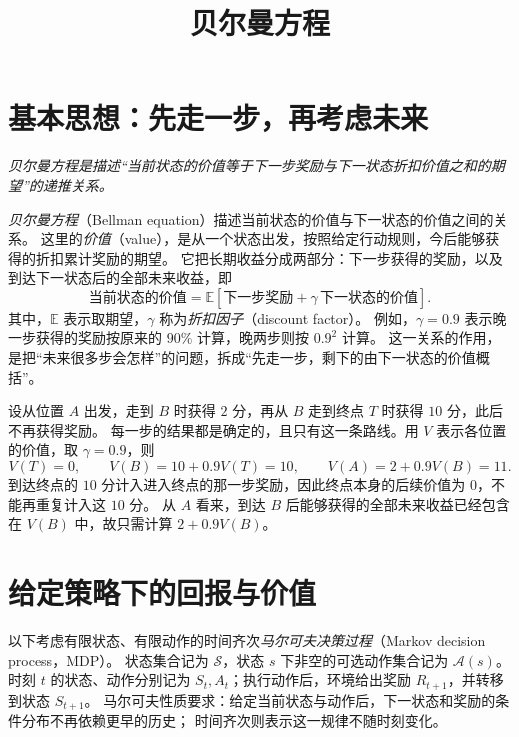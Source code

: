 \documentclass[UTF8,12pt,a4paper,fontset=fandol]{ctexart}
\title{贝尔曼方程}
\author{}
\date{}
\begin{document}
\maketitle

\section{基本思想：先走一步，再考虑未来}
\label{sec:bellman-intuition}

\emph{贝尔曼方程是描述“当前状态的价值等于下一步奖励与下一状态折扣价值之和的期望”的递推关系。}

\emph{贝尔曼方程}（Bellman equation）描述当前状态的价值与下一状态的价值之间的关系。
这里的\emph{价值}（value），是从一个状态出发，按照给定行动规则，今后能够获得的折扣累计奖励的期望。
它把长期收益分成两部分：下一步获得的奖励，以及到达下一状态后的全部未来收益，即
\[
  \boxed{\text{当前状态的价值}
  =\mathbb E\!\left[\text{下一步奖励}+\gamma\,\text{下一状态的价值}\right].}
\]
其中，$\mathbb E$ 表示取期望，$\gamma$ 称为\emph{折扣因子}（discount factor）。
例如，$\gamma=0.9$ 表示晚一步获得的奖励按原来的 $90\%$ 计算，晚两步则按 $0.9^2$ 计算。
这一关系的作用，是把“未来很多步会怎样”的问题，拆成“先走一步，剩下的由下一状态的价值概括”。

\begin{example}[两步到达终点]
\label{ex:bellman-two-step}
设从位置 $A$ 出发，走到 $B$ 时获得 $2$ 分，再从 $B$ 走到终点 $T$ 时获得 $10$ 分，此后不再获得奖励。
每一步的结果都是确定的，且只有这一条路线。用 $V$ 表示各位置的价值，取 $\gamma=0.9$，则
\[
  V(T)=0,\qquad
  V(B)=10+0.9V(T)=10,\qquad
  V(A)=2+0.9V(B)=11.
\]
到达终点的 $10$ 分计入进入终点的那一步奖励，因此终点本身的后续价值为 $0$，不能再重复计入这 $10$ 分。
从 $A$ 看来，到达 $B$ 后能够获得的全部未来收益已经包含在 $V(B)$ 中，故只需计算 $2+0.9V(B)$。
\end{example}

\section{给定策略下的回报与价值}
\label{sec:bellman-value}

以下考虑有限状态、有限动作的时间齐次\emph{马尔可夫决策过程}（Markov decision process，MDP）。
状态集合记为 $\mathcal S$，状态 $s$ 下非空的可选动作集合记为 $\mathcal A(s)$。
时刻 $t$ 的状态、动作分别记为 $S_t,A_t$；执行动作后，环境给出奖励 $R_{t+1}$，并转移到状态 $S_{t+1}$。
马尔可夫性质要求：给定当前状态与动作后，下一状态和奖励的条件分布不再依赖更早的历史；
时间齐次则表示这一规律不随时刻变化。
\end{document}
